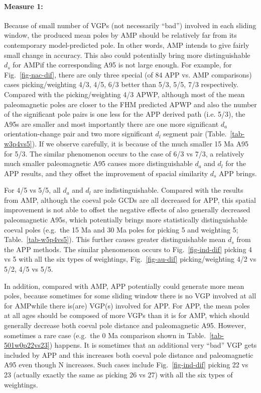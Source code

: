 \paragraph{Measure 1:}

Because of small number of VGPs (not necessarily ``bad'') involved in each
sliding window, the produced mean poles by AMP should be relatively far from
its contemporary model-predicted pole. In other words, AMP intends to give
fairly small change in accuracy. This also could potentially bring more
distinguishable $d_s$ for AMP\@ if the corresponding A95 is not large enough.
For example, for Fig.~\ref{fig-nac-dif}, there are only three special (of 84 APP
vs. AMP comparisons) cases picking/weighting 4/3, 4/5, 6/3 better than 5/3, 5/5,
7/3 respectively. Compared with the picking/weighting 4/3 APWP, although most of
the mean paleomagnetic poles are closer to the FHM predicted APWP and also the
number of the significant pole pairs is one less for the APP derived path (i.e.
5/3), the A95s are smaller and most importantly there are one more significant
$d_a$ orientation-change pair and two more significant $d_l$ segment pair
(Table.~\ref{tab-w3p4vs5}). If we observe carefully, it is because of the much
smaller 15 Ma A95 for 5/3. The similar phenomenon occurs to the case of 6/3 vs
7/3, a relatively much smaller paleomagnetic A95 causes more distinguishable
$d_a$ and $d_l$ for the APP results, and they offset the improvement of spacial
similarity $d_s$ APP brings.

For 4/5 vs 5/5, all $d_a$ and $d_l$ are indistinguishable. Compared with the
results from AMP, although the coeval pole GCDs are all decreased for APP, this
spatial improvement is not able to offset the negative effects of also
generally decreased paleomagnetic A95s, which potentially brings more
statistically distinguishable coeval poles (e.g.\ the 15 Ma and 30 Ma poles for
picking 5 and weighting 5; Table.~\ref{tab-w5p4vs5}). This further causes
greater distinguishable mean $d_s$ from the APP methods. The similar phenomenon
occurs to Fig.~\ref{fig-ind-dif} picking 4 vs 5 with all the six types of
weightings, Fig.~\ref{fig-au-dif} picking/weighting 4/2 vs
5/2, 4/5 vs 5/5.

In addition, compared with AMP, APP potentially could generate more mean poles,
because sometimes for some sliding window there is no VGP involved at all for
AMP\@ while there is(are) VGP(s) involved for APP\@. For APP, the mean poles at
all ages should be composed of more VGPs than it is for AMP, which should
generally decrease both coeval pole distance and paleomagnetic A95. However,
sometimes a rare case (e.g.\ the 0 Ma comparison shown in
Table.~\ref{tab-501w0p22vs23}) happens. It is sometimes that an additional
very ``bad'' VGP gets included by APP and this increases both coeval pole
distance and paleomagnetic A95 even though N increases. Such cases include
Fig.~\ref{fig-ind-dif} picking 22 vs 23 (actually exactly the same as picking 26
vs 27) with all the six types of weightings.

